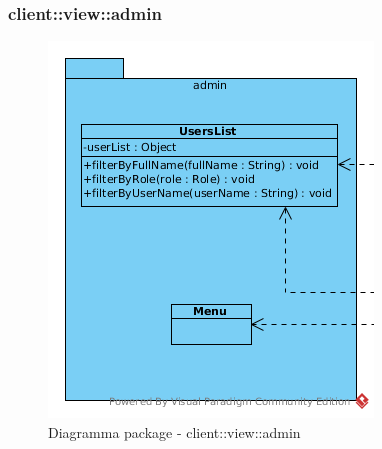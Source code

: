 \subsubsection{client::view::admin}
\begin{center}
		\begin{figure}[H]
			\centering \includegraphics[scale=4, max width=\textwidth, max height=\myheight]{../img/diagrammiClassi/client/view/admin.png}
			\caption{Diagramma package - client::view::admin}
		\end{figure}
	\end{center}\hypertarget{client::view::admin::UsersList}{}
